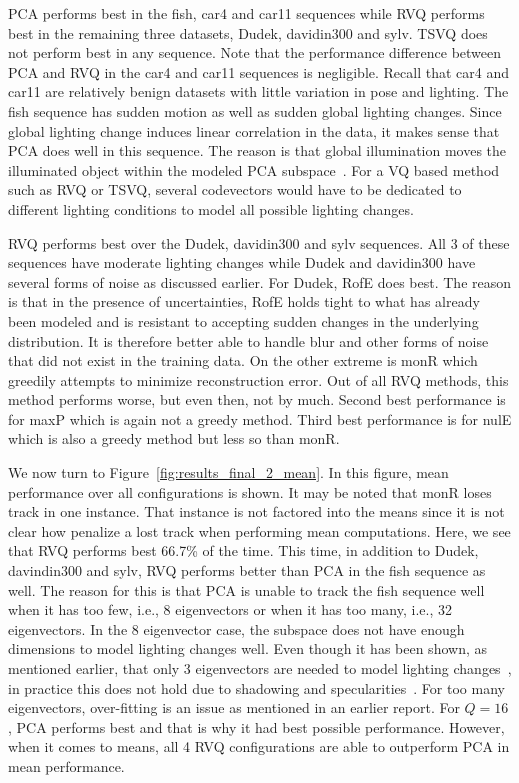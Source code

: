 \begin{Body}
PCA performs best in the fish, car4 and car11 sequences while RVQ performs best in the remaining three datasets, Dudek, davidin300 and sylv.  TSVQ does not perform best in any sequence.  Note that the performance difference between PCA and RVQ in the car4 and car11 sequences is negligible.  Recall that car4 and car11 are relatively benign datasets with little variation in pose and lighting.  The fish sequence has sudden motion as well as sudden global lighting changes.   Since global lighting change induces linear correlation in the data, it makes sense that PCA does well in this sequence.  The reason is that global illumination moves the illuminated object within the modeled PCA subspace~\cite{1987_JNL_Faces_Sirovich}.  For a VQ based method such as RVQ or TSVQ, several codevectors would have to be dedicated to different lighting conditions to model all possible lighting changes.  

RVQ performs best over the Dudek, davidin300 and sylv sequences.  All 3 of these sequences have moderate lighting changes while Dudek and davidin300 have several forms of noise as discussed earlier.  For Dudek, RofE does best.  The reason is that in the presence of uncertainties, RofE holds tight to what has already been modeled and is resistant to accepting sudden changes in the underlying distribution.  It is therefore better able to handle blur and other forms of noise that did not exist in the training data.  On the other extreme is monR which greedily attempts to minimize reconstruction error.  Out of all RVQ methods, this method performs worse, but even then, not by much.  Second best performance is for maxP which is again not a greedy method.  Third best performance is for nulE which is also a greedy method but less so than monR.

We now turn to Figure~\ref{fig:results_final_2_mean}.  In this figure, mean performance over all configurations is shown.  It may be noted that monR loses track in one instance.  That instance is not factored into the means since it is not clear how penalize a lost track when performing mean computations.  Here, we see that RVQ performs best 66.7\% of the time.  This time, in addition to Dudek, davindin300 and sylv, RVQ performs better than PCA in the fish sequence as well.  The reason for this is that PCA is unable to track the fish sequence well when it has too few, i.e., 8 eigenvectors or when it has too many, i.e., 32 eigenvectors.  In the 8 eigenvector case, the subspace does not have enough dimensions to model lighting changes well.  Even though it has been shown, as mentioned earlier, that only 3 eigenvectors are needed to model lighting changes~\cite{1987_JNL_Faces_Sirovich}, in practice this does not hold due to shadowing and specularities~\cite{1997_JNL_EigenVsFisherFaces_Bel}.  For too many eigenvectors, over-fitting is an issue as mentioned in an earlier report.  For $Q=16$, PCA performs best and that is why it had best possible performance.  However, when it comes to means, all 4 RVQ configurations are able to outperform PCA in mean performance.


\end{Body}
